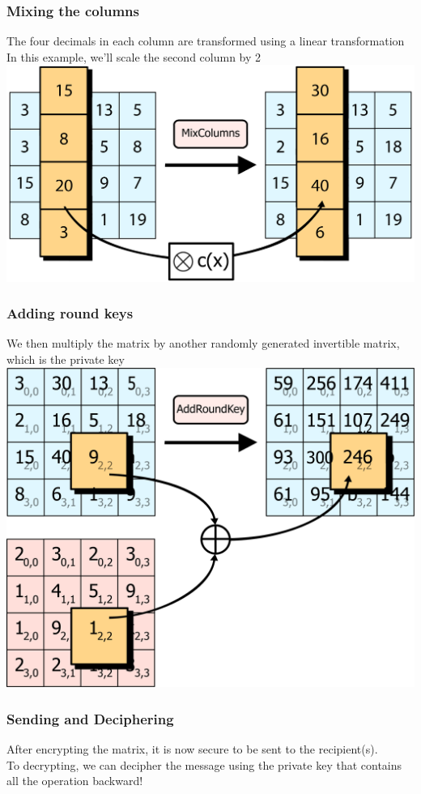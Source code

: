 \documentclass[11pt]{beamer}
\begin{document}
\begin{frame}\frametitle{Mixing the columns}
	The four decimals in each column are transformed using a linear transformation
	\center In this example, we'll scale the second column by 2
	\center \includegraphics[scale=0.05]{mix_column_1.png}
\end{frame}

\begin{frame}\frametitle{Adding round keys}
	We then multiply the matrix by another randomly generated invertible matrix, which is the private key
	\center \includegraphics[scale=0.25]{add_round_key.png}
\end{frame}

\begin{frame}\frametitle{Sending and Deciphering}
	After encrypting the matrix, it is now secure to be sent to the recipient(s).\\
	To decrypting, we can decipher the message using the private key that contains all the operation backward!
\end{frame}
\end{document}
